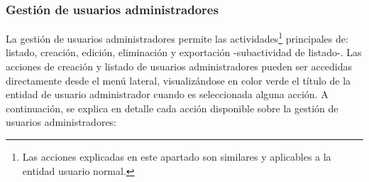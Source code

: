 \documentclass[12pt,a4paper, twoside]{report}
\begin{document}
	\subsubsection{Gestión de usuarios administradores}
	
	La gestión de usuarios administradores permite las actividades\footnote{Las acciones explicadas en este apartado son similares y aplicables a la entidad usuario normal.} principales de: listado, creación, edición, eliminación y exportación -subactividad de listado-. Las acciones de creación y listado de usuarios administradores pueden ser accedidas directamente desde el menú lateral, visualizándose en color verde el título de la entidad de usuario administrador cuando es seleccionada alguna acción. A continuación, se explica en detalle cada acción disponible sobre la gestión de usuarios administradores:
	
\end{document}
